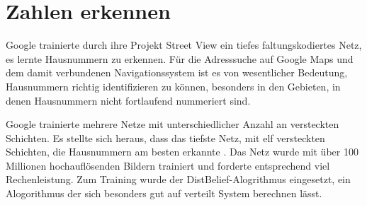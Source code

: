 
\section{Zahlen erkennen}

Google trainierte durch ihre Projekt Street View \citep{streetview} ein tiefes faltungskodiertes Netz, es lernte Hausnummern zu erkennen. Für die Adresssuche auf Google Maps und dem damit verbundenen Navigationssystem ist es von wesentlicher Bedeutung, Hausnummern richtig identifizieren zu können, besonders in den Gebieten, in denen Hausnummern nicht fortlaufend nummeriert sind.

Google trainierte mehrere Netze mit unterschiedlicher Anzahl an versteckten Schichten. Es stellte sich heraus, dass das tiefste Netz, mit elf versteckten Schichten, die Hausnummern am besten erkannte \citep{numbercharts}. Das Netz wurde mit über 100 Millionen hochauflösenden Bildern trainiert und forderte entsprechend viel Rechenleistung. Zum Training wurde der DistBelief-Alogrithmus \citep{distbelief} eingesetzt, ein Alogorithmus der sich besonders gut auf verteilt System berechnen lässt. 

